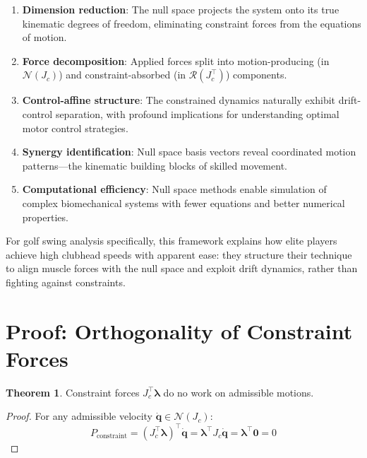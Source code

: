 \documentclass[11pt,a4paper]{article}
\theoremstyle{definition}
\newtheorem{theorem}{Theorem}[section]
\newcommand{\nullspace}{\mathcal{N}}
\newcommand{\rangespace}{\mathcal{R}}
\newcommand{\Jc}{J_c}
\newcommand{\qvec}{\bm{q}}
\newcommand{\lambdavec}{\bm{\lambda}}
\begin{document}
\begin{enumerate}
    \item \textbf{Dimension reduction}: The null space projects the system onto its true kinematic degrees of freedom, eliminating constraint forces from the equations of motion.
    
    \item \textbf{Force decomposition}: Applied forces split into motion-producing (in $\nullspace(\Jc)$) and constraint-absorbed (in $\rangespace(\Jc^\top)$) components.
    
    \item \textbf{Control-affine structure}: The constrained dynamics naturally exhibit drift-control separation, with profound implications for understanding optimal motor control strategies.
    
    \item \textbf{Synergy identification}: Null space basis vectors reveal coordinated motion patterns---the kinematic building blocks of skilled movement.
    
    \item \textbf{Computational efficiency}: Null space methods enable simulation of complex biomechanical systems with fewer equations and better numerical properties.
\end{enumerate}

For golf swing analysis specifically, this framework explains how elite players achieve high clubhead speeds with apparent ease: they structure their technique to align muscle forces with the null space and exploit drift dynamics, rather than fighting against constraints.

\appendix

\section{Proof: Orthogonality of Constraint Forces}

\begin{theorem}
Constraint forces $\Jc^\top \lambdavec$ do no work on admissible motions.
\end{theorem}

\begin{proof}
For any admissible velocity $\dot{\qvec} \in \nullspace(\Jc)$:
\begin{equation}
    P_{\text{constraint}} = (\Jc^\top \lambdavec)^\top \dot{\qvec} = \lambdavec^\top \Jc \dot{\qvec} = \lambdavec^\top \bm{0} = 0
\end{equation}
\end{proof}
\end{document}
